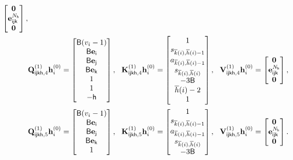 \begin{align*}
\begin{bmatrix}
\bzero\\\be^{\Numvi_\sh}_{\si\sj\sk}
\\\bzero\end{bmatrix},\\
&\bQ^{(1)}_{\si\sj\sk\sh,4}\bh^{(0)}_{i}=
\begin{bmatrix}
\tfthres(\oddeven_i-1)\\
        \tfthres\be_\si\\
         \tfthres\be_\sj\\
          \tfthres\be_\sk\\
          1\\
          1\\
         -\sh
    \end{bmatrix},~~ \bK^{(1)}_{\si\sj\sk\sh,4}\bh^{(0)}_{i}=\begin{bmatrix}1\\
     \state_{\bar{k}(i),\bar{h}(i)-1}\\
        \action_{\bar{k}(i),\bar{h}(i)-1}\\
         \state_{\bar{k}(i),\bar{h}(i)}\\
        -3\tfthres\\
      \bar{h}(i)-2\\
        1
\end{bmatrix},~~ \bV^{(1)}_{\si\sj\sk\sh,4}\bh^{(0)}_{i}=
\begin{bmatrix}
\bzero\\\be^{\Numvi_\sh}_{\si\sj\sk}
\\\bzero\end{bmatrix},\\
&\bQ^{(1)}_{\si\sj\sk\sh,5}\bh^{(0)}_{i}=
\begin{bmatrix}
\tfthres(\oddeven_i-1)\\
        \tfthres\be_\si\\
         \tfthres\be_\sj\\
          \tfthres\be_\sk\\
          1\\
    \end{bmatrix},~~ \bK^{(1)}_{\si\sj\sk\sh,5}\bh^{(0)}_{i}=\begin{bmatrix}1\\
     \state_{\bar{k}(i),\bar{h}(i)-1}\\
        \action_{\bar{k}(i),\bar{h}(i)-1}\\
         \state_{\bar{k}(i),\bar{h}(i)}\\
        -3\tfthres\\
\end{bmatrix},~~ \bV^{(1)}_{\si\sj\sk\sh,5}\bh^{(0)}_{i}=
\begin{bmatrix}
\bzero\\\be^{\Numvi_\sh}_{\si\sj\sk}
\\\bzero\end{bmatrix}.\\
\end{align*}

